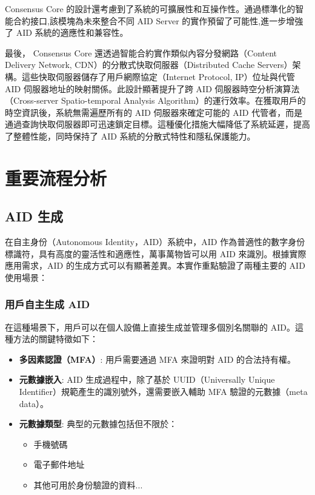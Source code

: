Consensus Core 的設計還考慮到了系統的可擴展性和互操作性。通過標準化的智能合約接口,該模塊為未來整合不同 AID Server 的實作預留了可能性,進一步增強了 AID 系統的適應性和兼容性。

最後， Consensus Core 還透過智能合約實作類似內容分發網路（Content Delivery Network, CDN）的分散式快取伺服器（Distributed Cache Servers）架構。這些快取伺服器儲存了用戶網際協定（Internet Protocol, IP）位址與代管 AID 伺服器地址的映射關係。此設計顯著提升了跨 AID 伺服器時空分析演算法（Cross-server Spatio-temporal Analysis Algorithm）的運行效率。在獲取用戶的時空資訊後，系統無需遍歷所有的 AID 伺服器來確定可能的 AID 代管者，而是通過查詢快取伺服器即可迅速鎖定目標。這種優化措施大幅降低了系統延遲，提高了整體性能，同時保持了 AID 系統的分散式特性和隱私保護能力。

\section{重要流程分析}
\subsection{AID 生成}

在自主身份（Autonomous Identity，AID）系統中，AID 作為普適性的數字身份標識符，具有高度的靈活性和適應性，萬事萬物皆可以用 AID 來識別。根據實際應用需求，AID 的生成方式可以有顯著差異。本實作重點驗證了兩種主要的 AID 使用場景：

\subsubsection{用戶自主生成 AID}

在這種場景下，用戶可以在個人設備上直接生成並管理多個別名關聯的 AID。這種方法的關鍵特徵如下：

\begin{itemize}
  \item \textbf{多因素認證（MFA）}: 用戶需要通過 MFA 來證明對 AID 的合法持有權。
  \item \textbf{元數據嵌入}: AID 生成過程中，除了基於 UUID（Universally Unique Identifier）規範產生的識別號外，還需要嵌入輔助 MFA 驗證的元數據（meta data）。
  \item \textbf{元數據類型}: 典型的元數據包括但不限於：
        \begin{itemize}
          \item 手機號碼
          \item 電子郵件地址
          \item 其他可用於身份驗證的資料...
        \end{itemize}
\end{itemize}

